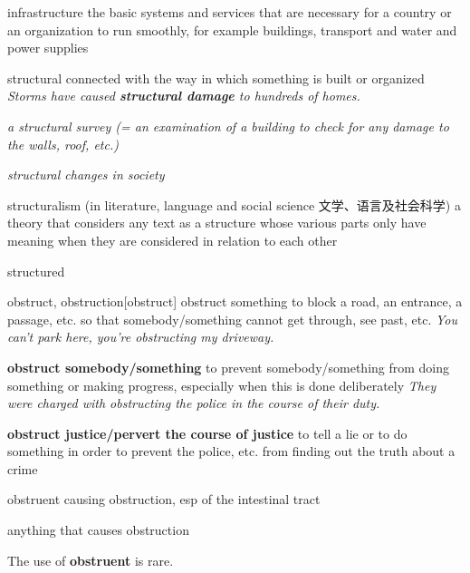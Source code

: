 \begin{DefWord}{infrastructure}
    the basic systems and services that are necessary for a country or an organization to run smoothly, for example buildings, transport and water and power supplies
\end{DefWord}

\begin{DefWord}{structural}
    connected with the way in which something is built or organized
    \textit{Storms have caused \textbf{structural damage} to hundreds of homes.}

    \textit{a structural survey (= an examination of a building to check for any damage to the walls, roof, etc.)}

    \textit{structural changes in society}
\end{DefWord}

\begin{DefWord}{structuralism}
    (in literature, language and social science 文学、语言及社会科学) a theory that considers any text as a structure whose various parts only have meaning when they are considered in relation to each other
\end{DefWord}

\begin{DefWord}{structured}
\end{DefWord}

\begin{DefWord}{obstruct, obstruction}[obstruct]
    obstruct something to block a road, an entrance, a passage, etc. so that somebody/something cannot get through, see past, etc.
    \textit{You can't park here, you're obstructing my driveway.}

    \textbf{obstruct somebody/something} to prevent somebody/something from doing something or making progress, especially when this is done deliberately
    \textit{They were charged with obstructing the police in the course of their duty.}

    \textbf{obstruct justice/pervert the course of justice} to tell a lie or to do something in order to prevent the police, etc. from finding out the truth about a crime
\end{DefWord}

\begin{DefWord}{obstruent}
    causing obstruction, esp of the intestinal tract

    anything that causes obstruction
\end{DefWord}

\begin{remark}
    The use of \textbf{obstruent} is rare.
\end{remark}


